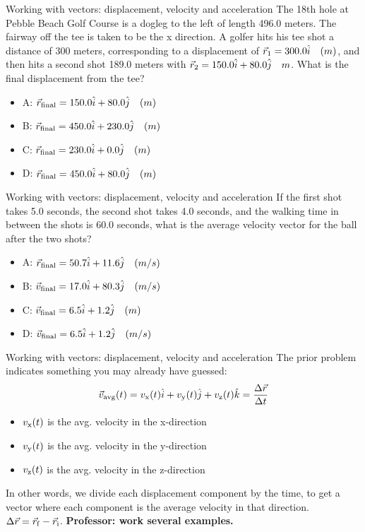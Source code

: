 \documentclass{beamer}
\begin{document}
\begin{frame}{Working with vectors: displacement, velocity and acceleration}
\small
The 18th hole at Pebble Beach Golf Course is a dogleg to the left of length 496.0 meters.  The fairway off the tee is taken to be the x direction.  A golfer hits his tee shot a distance of 300 meters, corresponding to a displacement of $\vec{r}_{\rm 1} = 300.0 \hat{i} \quad (m)$, and then hits a second shot 189.0 meters with $\vec{r}_{\rm 2} = 150.0 \hat{i} + 80.0 \hat{j} \quad m$.  What is the final displacement from the tee?
\begin{itemize}
\item A: $\vec{r}_{\rm final} = 150.0 \hat{i} + 80.0\hat{j}\quad (m)$
\item B: $\vec{r}_{\rm final} = 450.0 \hat{i} + 230.0\hat{j}\quad (m)$
\item C: $\vec{r}_{\rm final} = 230.0 \hat{i} + 0.0\hat{j}\quad (m)$
\item D: $\vec{r}_{\rm final} = 450.0 \hat{i} + 80.0\hat{j}\quad (m)$
\end{itemize}
\end{frame}

\begin{frame}{Working with vectors: displacement, velocity and acceleration}
\small
If the first shot takes 5.0 seconds, the second shot takes 4.0 seconds, and the walking time in between the shots is 60.0 seconds, what is the average velocity vector for the ball after the two shots?
\begin{itemize}
\item A: $\vec{r}_{\rm final} = 50.7 \hat{i} + 11.6\hat{j}\quad (m/s)$
\item B: $\vec{v}_{\rm final} = 17.0 \hat{i} + 80.3\hat{j}\quad (m/s)$
\item C: $\vec{v}_{\rm final} = 6.5 \hat{i} + 1.2\hat{j}\quad (m)$
\item D: $\vec{v}_{\rm final} = 6.5 \hat{i} + 1.2\hat{j}\quad (m/s)$
\end{itemize}
\end{frame}

\begin{frame}{Working with vectors: displacement, velocity and acceleration}
The prior problem indicates something you may already have guessed:
\begin{equation}
\vec{v}_{\rm avg}(t) = v_{\rm x}(t) \hat{i} + v_{\rm y}(t) \hat{j} + v_{\rm z}(t) \hat{k} = \frac{\Delta\vec{r}}{\Delta t}
\label{eq:vel}
\end{equation}
\begin{itemize}
\item $v_{\rm x}(t)$ is the avg. velocity in the x-direction
\item $v_{\rm y}(t)$ is the avg. velocity in the y-direction
\item $v_{\rm z}(t)$ is the avg. velocity in the z-direction
\end{itemize}
In other words, we divide each displacement component by the time, to get a vector where each component is the average velocity in that direction.  $\Delta\vec{r} = \vec{r}_{\rm f} - \vec{r}_{\rm i}$. \textbf{Professor: work several examples.}
\end{frame}
\end{document}
